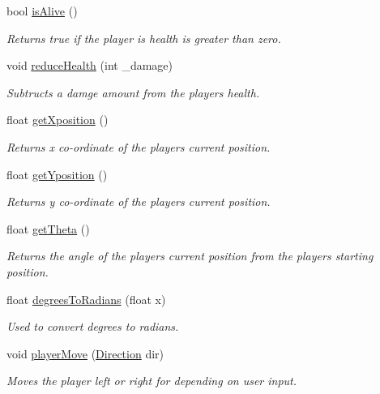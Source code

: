 \begin{DoxyCompactItemize}
bool \hyperlink{class_player_logic_a765133271ba47a6fa9b2b45136f1fe73}{is\+Alive} ()
\begin{DoxyCompactList}\small\item\em Returns true if the player is health is greater than zero. \end{DoxyCompactList}\item 
void \hyperlink{class_player_logic_a43c4cfcdfd439ff3ef8015c2170f9381}{reduce\+Health} (int \+\_\+damage)
\begin{DoxyCompactList}\small\item\em Subtructs a damge amount from the players health. \end{DoxyCompactList}\item 
float \hyperlink{class_player_logic_a9f92defe2d43690329bd6e334fb61e01}{get\+Xposition} ()
\begin{DoxyCompactList}\small\item\em Returns x co-\/ordinate of the player\textquotesingle{}s current position. \end{DoxyCompactList}\item 
float \hyperlink{class_player_logic_a58d683bde5ee078f3b21897f2a5f4677}{get\+Yposition} ()
\begin{DoxyCompactList}\small\item\em Returns y co-\/ordinate of the player\textquotesingle{}s current position. \end{DoxyCompactList}\item 
float \hyperlink{class_player_logic_a7ea2f59ddde028b5451ddbe60453de1c}{get\+Theta} ()
\begin{DoxyCompactList}\small\item\em Returns the angle of the player\textquotesingle{}s current position from the players starting position. \end{DoxyCompactList}\item 
float \hyperlink{class_player_logic_a425e0b7a5a4495958a41383525f059eb}{degrees\+To\+Radians} (float x)
\begin{DoxyCompactList}\small\item\em Used to convert degrees to radians. \end{DoxyCompactList}\item 
void \hyperlink{class_player_logic_a2b63d2c01e898e5798c2801466c8b432}{player\+Move} (\hyperlink{_game_common_data_8h_a224b9163917ac32fc95a60d8c1eec3aa}{Direction} dir)
\begin{DoxyCompactList}\small\item\em Moves the player left or right for depending on user input. \end{DoxyCompactList}\item 

\end{DoxyCompactItemize}
